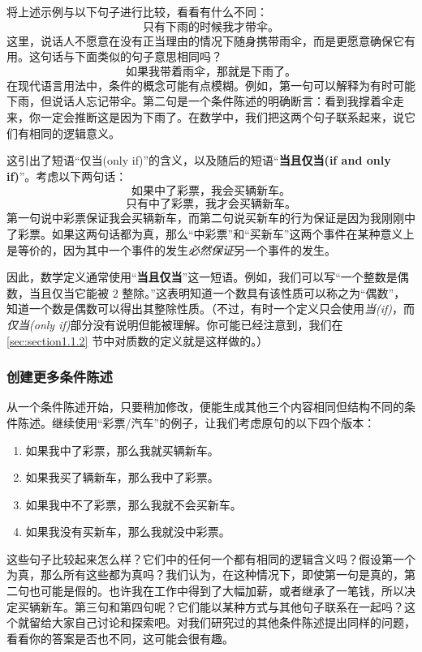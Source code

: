 将上述示例与以下句子进行比较，看看有什么不同：
\[\text{只有下雨的时候我才带伞。}\]
这里，说话人不愿意在没有正当理由的情况下随身携带雨伞，而是更愿意确保它有用。这句话与下面类似的句子意思相同吗？
\[\text{如果我带着雨伞，那就是下雨了。}\]
在现代语言用法中，条件的概念可能有点模糊。例如，第一句可以解释为有时可能下雨，但说话人忘记带伞。第二句是一个条件陈述的明确断言：看到我撑着伞走来，你一定会推断这是因为下雨了。在数学中，我们把这两个句子联系起来，说它们有相同的逻辑意义。

这引出了短语“仅当(only if)”的含义，以及随后的短语“\textbf{当且仅当(if and only if)}”。考虑以下两句话：
\[\text{如果中了彩票，我会买辆新车。}\]
\[\textit{只有}\text{中了彩票，我才会买辆新车。}\]
第一句说中彩票保证我会买辆新车，而第二句说买新车的行为保证是因为我刚刚中了彩票。如果这两句话都为真，那么“中彩票”和“买新车”这两个事件在某种意义上是等价的，因为其中一个事件的发生\textit{必然保证}另一个事件的发生。

因此，数学定义通常使用“\textbf{当且仅当}”这一短语。例如，我们可以写“一个整数是偶数，当且仅当它能被 $2$ 整除。”这表明知道一个数具有该性质可以称之为“偶数”，知道一个数是偶数可以得出其整除性质。（不过，有时一个定义只会使用\textit{当(if)}，而\textit{仅当(only if)}部分没有说明但能被理解。你可能已经注意到，我们在 \ref{sec:section1.1.2} 节中对质数的定义就是这样做的。）

\subsubsection*{创建更多条件陈述}

从一个条件陈述开始，只要稍加修改，便能生成其他三个内容相同但结构不同的条件陈述。继续使用“彩票/汽车”的例子，让我们考虑原句的以下四个版本：

\begin{enumerate}
    \item 如果我中了彩票，那么我就买辆新车。
    \item 如果我买了辆新车，那么我中了彩票。
    \item 如果我中不了彩票，那么我就不会买新车。
    \item 如果我没有买新车，那么我就没中彩票。
\end{enumerate}

这些句子比较起来怎么样？它们中的任何一个都有相同的逻辑含义吗？假设第一个为真，那么所有这些都为真吗？我们认为，在这种情况下，即使第一句是真的，第二句也可能是假的。也许我在工作中得到了大幅加薪，或者继承了一笔钱，所以决定买辆新车。第三句和第四句呢？它们能以某种方式与其他句子联系在一起吗？这个就留给大家自己讨论和探索吧。对我们研究过的其他条件陈述提出同样的问题，看看你的答案是否也不同，这可能会很有趣。

